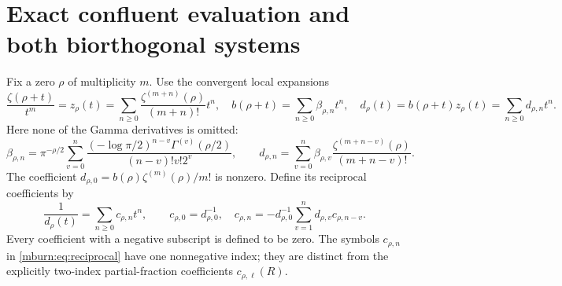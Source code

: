 \section{Exact confluent evaluation and both biorthogonal systems}

Fix a zero $\rho$ of multiplicity $m$. Use the convergent local
expansions
\begin{equation}\label{mburn:eq:local}
 \frac{\zeta(\rho+t)}{t^m}=z_\rho(t)
  =\sum_{n\geq0}\frac{\zeta^{(m+n)}(\rho)}{(m+n)!}t^n,
 \quad b(\rho+t)=\sum_{n\geq0}\beta_{\rho,n}t^n,
 \quad d_\rho(t)=b(\rho+t)z_\rho(t)=\sum_{n\geq0}d_{\rho,n}t^n.
\end{equation}
Here none of the Gamma derivatives is omitted:
\begin{equation}\label{mburn:eq:gamma-coeff}
 \beta_{\rho,n}=\pi^{-\rho/2}
 \sum_{v=0}^n
 \frac{(-\log\pi/2)^{n-v}\Gamma^{(v)}(\rho/2)}
                   {(n-v)!v!2^v},\qquad
 d_{\rho,n}=\sum_{v=0}^n\beta_{\rho,v}
                  \frac{\zeta^{(m+n-v)}(\rho)}{(m+n-v)!}.
\end{equation}
The coefficient $d_{\rho,0}=b(\rho)\zeta^{(m)}(\rho)/m!$
is nonzero. Define its reciprocal coefficients by
\begin{equation}\label{mburn:eq:reciprocal}
 \frac1{d_\rho(t)}=\sum_{n\geq0}c_{\rho,n}t^n,\qquad
 c_{\rho,0}=d_{\rho,0}^{-1},\quad
 c_{\rho,n}=-d_{\rho,0}^{-1}
                    \sum_{v=1}^nd_{\rho,v}c_{\rho,n-v}.
\end{equation}
Every coefficient with a negative subscript is defined to be zero.
The symbols $c_{\rho,n}$ in \eqref{mburn:eq:reciprocal} have one
nonnegative index; they are distinct from the explicitly
two-index partial-fraction coefficients $c_{\rho,\ell}(R)$.

